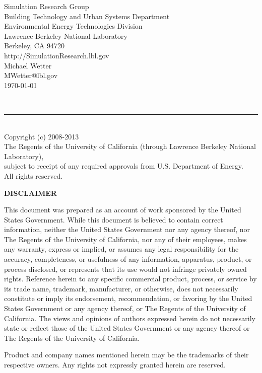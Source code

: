 \documentclass[11pt]{report}
\renewcommand{\date}{\today}
\begin{document}
\begin{titlepage}
\begin{minipage}{\headwidth}
\begin{center}
\large{Simulation Research Group}\\
\large{Building Technology and Urban Systems Department}\\
 \large{Environmental
Energy Technologies Division}\\
\large{Lawrence Berkeley National
Laboratory}\\
\large{Berkeley, CA 94720}
\\[10mm]
\large{http://SimulationResearch.lbl.gov}
\\[10mm]
\large{Michael Wetter}\\
\large{MWetter@lbl.gov}
\\[10mm]
\large{\date}
\\[40mm]
\end{center}
~\\[15mm]
\hrule
~\\[2mm]
Copyright (c) 2008-2013\\
The Regents of the University of California 
(through Lawrence Berkeley National Laboratory),\\
subject to receipt of any required approvals from U.S. Department of Energy.\\
All rights reserved.
\end{minipage}
\end{titlepage}

\begin{center}
\bf \Large DISCLAIMER
\end{center}
This document was prepared as an account of work sponsored by the United States
Government. While this document is believed to contain correct information, neither the
United States Government nor any agency thereof, nor The Regents of the University of
California, nor any of their employees, makes any warranty, express or implied, or assumes
any legal responsibility for the accuracy, completeness, or usefulness of any information,
apparatus, product, or process disclosed, or represents that its use would not infringe
privately owned rights. Reference herein to any specific commercial product, process, or
service by its trade name, trademark, manufacturer, or otherwise, does not necessarily
constitute or imply its endorsement, recommendation, or favoring by the United States
Government or any agency thereof, or The Regents of the University of California. The
views and opinions of authors expressed herein do not necessarily state or reflect those of the
United States Government or any agency thereof or The Regents of the University of
California.

\vfill
\small{\vspace{2mm} \noindent Product and company names mentioned herein may be the trademarks of their respective owners. Any rights not expressly granted herein are reserved.}
\end{document}
